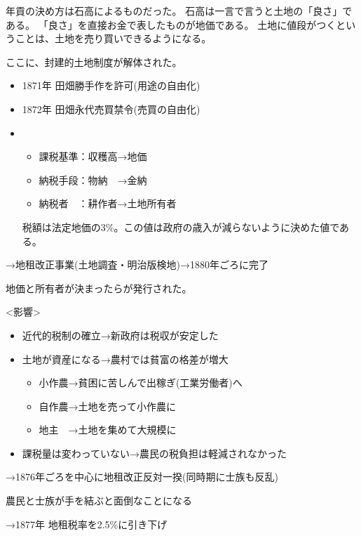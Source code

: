 \documentclass[12pt,fleqn]{ltjsarticle}
\begin{document}
年貢の決め方は石高によるものだった。
石高は一言で言うと土地の「良さ」である。
「良さ」を直接お金で表したものが地価である。
土地に値段がつくということは、土地を売り買いできるようになる。

ここに、封建的土地制度が解体された。
\begin{itemize}
\item 1871年 田畑勝手作を許可(用途の自由化)
\item 1872年 田畑永代売買禁令(売買の自由化)
\item {}
\begin{itemize}
\item 課税基準：収穫高→地価
\item 納税手段：物納　→金納
\item 納税者　：耕作者→土地所有者
\end{itemize}
税額は法定地価の3\%。この値は政府の歳入が減らないように決めた値である。
\end{itemize}

→地租改正事業(土地調査・明治版検地)→1880年ごろに完了

地価と所有者が決まったらが発行された。

<影響>
\begin{itemize}
\item 近代的税制の確立→新政府は税収が安定した
\item 土地が資産になる→農村では貧富の格差が増大
\begin{itemize}
\item 小作農→貧困に苦しんで出稼ぎ(工業労働者)へ
\item 自作農→土地を売って小作農に
\item 地主　→土地を集めて大規模に
\end{itemize}
\item 課税量は変わっていない→農民の税負担は軽減されなかった
\end{itemize}
→1876年ごろを中心に地租改正反対一揆(同時期に士族も反乱)

農民と士族が手を結ぶと面倒なことになる

→1877年 地租税率を2.5\%に引き下げ
\end{document}

